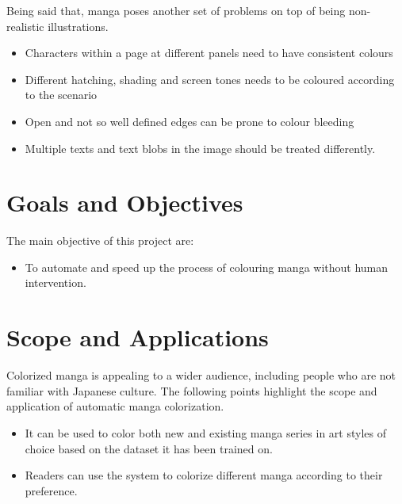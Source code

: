 \noindent Being said that, manga poses another set of problems on top of being non-realistic illustrations. 
\begin{itemize}
    \item Characters within a page at different panels need to have consistent colours
    \item Different hatching, shading and screen tones needs to be coloured according to the scenario
    \item Open and not so well defined edges can be prone to colour bleeding 
    \item Multiple texts and text blobs in the image should be treated differently.
\end{itemize}

\section{Goals and Objectives}
    The main objective of this project are:
    \begin{itemize}
         \item To automate and speed up the process of colouring manga without   human intervention.
    \end{itemize}

\section{Scope and Applications}

Colorized manga is appealing to a wider audience, including people who are not familiar with Japanese culture. The following points highlight the scope and application of automatic manga colorization.
\begin{itemize}
    \item It can be used to color both new and existing manga series in art styles of choice based on the dataset it has been trained on.
    \item Readers can use the system to colorize different manga according to their preference.
\end{itemize}
